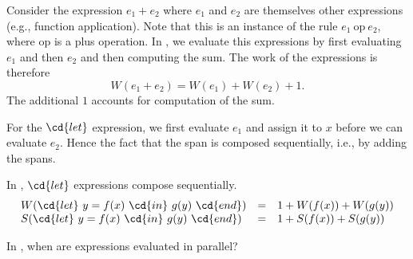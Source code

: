 \begin{cluster}
\begin{definition}
\end{definition}
\end{cluster}

\begin{cluster}
\label{grp:xmpl:analysis::models::consider}

\begin{example}
\label{xmpl:analysis::models::consider}
Consider the expression $e_1 + e_2$ where $e_1$ and $e_2$ are
themselves other expressions (e.g., function application).  Note that
this is an instance of the rule $e_1~\mbox{op}~e_2$, where \mbox{op} is a plus operation.
In \PML{}, we evaluate this expressions by first evaluating $e_1$ and
then $e_2$ and then computing the sum.  The work of the expressions is
therefore
\[
W(e_1 + e_2) = W(e_1) + W(e_2) + 1
.
\]
The additional $1$ accounts for computation of the sum.   

\end{example}
\end{cluster}

\begin{flex}
\label{grp:grm:analysis::models::span}

\begin{gram}
\label{grm:analysis::models::span}
For the $\cd{let}$ expression, we first evaluate $e_1$ and assign it
to $x$ before we can evaluate $e_2$.  Hence the fact that the span is
composed sequentially, i.e., by adding the spans.

\end{gram}

\begin{example}
\label{xmpl:analysis::models::expressions}
In \pml, $\cd{let}$ expressions compose sequentially.
\[
\begin{array}{lcl}
W(\cd{let}~y = f(x)~\cd{in}~g(y)~\cd{end}) & = & 1 + W(f(x)) + W(g(y))
\\
S(\cd{let}~y = f(x)~\cd{in}~g(y)~\cd{end}) & = & 1 + S(f(x)) + S(g(y))
\end{array}
\]

\end{example}
\end{flex}

\begin{cluster}
\label{grp:tch:analysis::models::expressions}

\begin{teachask}
\label{tch:analysis::models::expressions}
In \PML{}, when are expressions evaluated in parallel?

\end{teachask}
\end{cluster}

